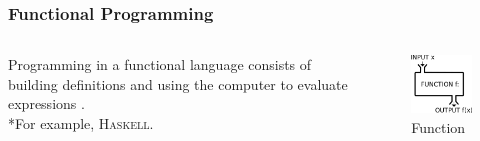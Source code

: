 \documentclass[aspectratio=1610]{beamer}
\begin{document}
\begin{frame}
\frametitle{Functional Programming}
  \begin{columns}[T]
    \begin{column}{.6\textwidth}
     \begin{block}{}
Programming in a functional language consists of building definitions and using the computer to evaluate expressions \cite{itfp}. 
\\*For example, \textsc{Haskell}.
    \end{block}
    \end{column}
    \begin{column}{.4\textwidth}
    \begin{block}{}
\begin{figure}
    \includegraphics[width=\textwidth]{function-machine.jpeg} 
    \caption{Function \cite{funcmachine}}
 \end{figure}   
    \end{block}
    \end{column}
  \end{columns}
\end{frame}

\end{document}
